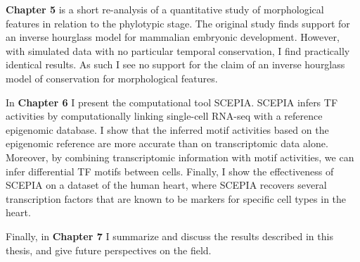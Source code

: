 \textbf{Chapter 5} is a short re-analysis of a quantitative study of morphological features in relation to the phylotypic stage. The original study finds support for an inverse hourglass model for mammalian embryonic development. However, with simulated data with no particular temporal conservation, I find practically identical results. As such I see no support for the claim of an inverse hourglass model of conservation for morphological features.

In \textbf{Chapter 6} I present the computational tool SCEPIA. SCEPIA infers TF activities by computationally linking single-cell RNA-seq with a reference epigenomic database. I show that the inferred motif activities based on the epigenomic reference are more accurate than on transcriptomic data alone. Moreover, by combining transcriptomic information with motif activities, we can infer differential TF motifs between cells. Finally, I show the effectiveness of SCEPIA on a dataset of the human heart, where SCEPIA recovers several transcription factors that are known to be markers for specific cell types in the heart.

Finally, in \textbf{Chapter 7} I summarize and discuss the results described in this thesis, and give future perspectives on the field.
